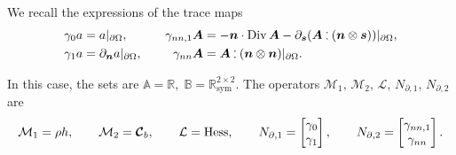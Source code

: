 We recall the expressions of the trace maps
\begin{equation}
\begin{aligned}
\gamma_{0}a &= a\vert_{\partial\Omega}, \\
\gamma_{1}a &= \partial_{\bm{n}} a \vert_{\partial\Omega},
\end{aligned}\qquad
\begin{aligned}
\gamma_{nn, 1}\bm{A} &= -\bm{n} \cdot \Div \bm{A} - \partial_{\bm{s}} (\bm{A} \cddot (\bm{n} \otimes \bm{s}))\vert_{\partial\Omega}, \\
\gamma_{nn}\bm{A} &= \bm{A} \cddot (\bm{n} \otimes \bm{n})\vert_{\partial\Omega}.
\end{aligned}
\end{equation}

In this case, the sets are $\mathbb{A}=\mathbb{R}, \;  \mathbb{B}=\mathbb{R}^{2\times 2}_{\text{sym}}$. The  operators $\mathcal{M}_1, \, \mathcal{M}_2, \, \mathcal{L}, \, N_{\partial, 1}, \, N_{\partial, 2}$ are
\begin{equation}
\mathcal{M}_1 = \rho h, \qquad 
\mathcal{M}_2 = \bm{\mathcal{C}}_b, \qquad 
\mathcal{L}= \operatorname*{Hess}, \qquad
N_{\partial, 1} = \begin{bmatrix}
\gamma_0 \\ \gamma_1
\end{bmatrix}, \qquad 
N_{\partial, 2} = \begin{bmatrix}
\gamma_{nn,1} \\ \gamma_{nn}
\end{bmatrix}.
\end{equation}

